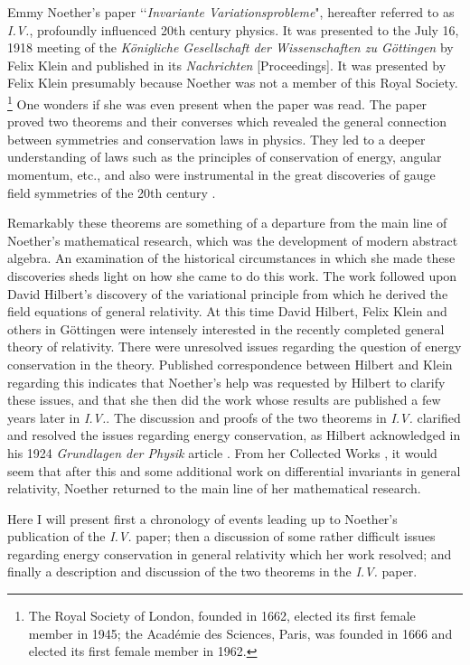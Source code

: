 \documentclass[12pt]{article}
\begin{document}
 
Emmy Noether's paper \lq\lq{\it{Invariante Variationsprobleme}}"\cite{noet},
hereafter referred to as {\it{I.V.}}, profoundly influenced 20th century
physics.  It was presented to the July 16, 1918 meeting of the
{\it{K\"{o}nigliche Gesellschaft der Wissenschaften zu G\"{o}ttingen}} by Felix 
Klein and published in its {\it{Nachrichten}} [Proceedings]. It was presented by 
 Felix Klein  presumably because
Noether was not a member of this Royal Society.%
{\footnote{The Royal Society of London, founded in 1662, elected its first
female member in 1945; the Acad\'{e}mie des Sciences, Paris, was founded in
1666 and elected its first female member in 1962.}} One wonders if she was even
present when the paper was read.  The paper proved two theorems and their
converses which revealed the general connection between symmetries and
conservation laws in physics.  They led to a deeper understanding of laws such
as the principles of conservation of energy, angular momentum, etc., and also
were instrumental in the great discoveries of gauge field symmetries of the 20th
century \cite{byers}.

Remarkably these theorems are something of a departure from the main line of Noether's
mathematical research, which was the development of modern abstract algebra.  An examination
of the historical circumstances in which she made these discoveries sheds light on how she came to do this work.
  The work  followed upon David Hilbert's discovery
of the variational principle from which he derived
  the field equations of
general relativity.  
At this time 
 David Hilbert, Felix Klein and others in G\"{o}ttingen were intensely  interested in the recently  completed general theory of relativity. There were
unresolved issues regarding the question of energy conservation in the theory.
Published correspondence \cite{klein} 
between Hilbert and Klein regarding this indicates that   Noether's help was requested by Hilbert to clarify these
issues, and that she
then did the work whose results are published a few years later in {\it{I.V.}}. 
The discussion and proofs of  the two theorems  in {\it{I.V.}} clarified and
resolved the issues regarding energy conservation, as Hilbert acknowledged
in his 1924 {\it{Grundlagen der Physik}} article \cite{hilbert1}. From her Collected Works \cite{publist}, it would
seem that after this and some additional work on
differential invariants in general relativity\cite{paper1}, Noether returned to the main line
of her mathematical research.

Here I will present first a chronology of events leading up to Noether's publication of the
{\it{I.V.}} paper;  then a discussion of some rather difficult issues regarding
energy conservation in general relativity which her work resolved; and finally a
description and discussion of the two theorems in the {\it{I.V.}} paper.
\end{document}
